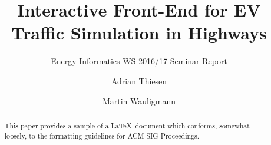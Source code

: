 \documentclass[sigconf]{acmart}
\begin{document}
\title{Interactive Front-End for EV Traffic Simulation in Highways}
\subtitle{Energy Informatics WS 2016/17 Seminar Report}

\author{Adrian Thiesen}
\vspace{2cm}

\author{Martin Wauligmann}
\vspace{2cm}


\begin{abstract}
This paper provides a sample of a \LaTeX\ document which conforms,
somewhat loosely, to the formatting guidelines for
ACM SIG Proceedings.
\end{abstract}



\maketitle





\end{document}
